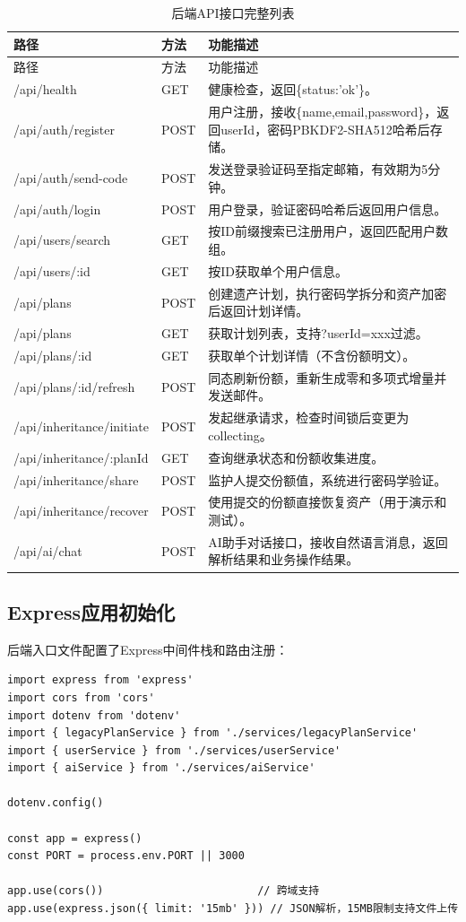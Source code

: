 \documentclass[UTF8,a4paper,zihao=-4,openany]{ctexrep}
\begin{document}
\setlength{\extrarowheight}{3pt}
\begin{longtable}{p{4.2cm}p{1.5cm}p{8.5cm}}
\caption{后端API接口完整列表}\\
\toprule
路径 & 方法 & 功能描述\\
\midrule
\endfirsthead
\toprule
路径 & 方法 & 功能描述\\
\midrule
\endhead
/api/health & GET & 健康检查，返回\{status:'ok'\}。\\
/api/auth/register & POST & 用户注册，接收\{name,email,password\}，返回userId，密码PBKDF2-SHA512哈希后存储。\\
/api/auth/send-code & POST & 发送登录验证码至指定邮箱，有效期为5分钟。\\
/api/auth/login & POST & 用户登录，验证密码哈希后返回用户信息。\\
/api/users/search & GET & 按ID前缀搜索已注册用户，返回匹配用户数组。\\
/api/users/:id & GET & 按ID获取单个用户信息。\\
/api/plans & POST & 创建遗产计划，执行密码学拆分和资产加密后返回计划详情。\\
/api/plans & GET & 获取计划列表，支持?userId=xxx过滤。\\
/api/plans/:id & GET & 获取单个计划详情（不含份额明文）。\\
/api/plans/:id/refresh & POST & 同态刷新份额，重新生成零和多项式增量并发送邮件。\\
/api/inheritance/initiate & POST & 发起继承请求，检查时间锁后变更为collecting。\\
/api/inheritance/:planId & GET & 查询继承状态和份额收集进度。\\
/api/inheritance/share & POST & 监护人提交份额值，系统进行密码学验证。\\
/api/inheritance/recover & POST & 使用提交的份额直接恢复资产（用于演示和测试）。\\
/api/ai/chat & POST & AI助手对话接口，接收自然语言消息，返回解析结果和业务操作结果。\\
\bottomrule
\end{longtable}

\subsection{Express应用初始化}

后端入口文件配置了Express中间件栈和路由注册：

\begin{lstlisting}[caption={Express应用初始化 (index.ts:1-14)}]
import express from 'express'
import cors from 'cors'
import dotenv from 'dotenv'
import { legacyPlanService } from './services/legacyPlanService'
import { userService } from './services/userService'
import { aiService } from './services/aiService'

dotenv.config()

const app = express()
const PORT = process.env.PORT || 3000

app.use(cors())                        // 跨域支持
app.use(express.json({ limit: '15mb' })) // JSON解析，15MB限制支持文件上传
\end{lstlisting}
\end{document}
